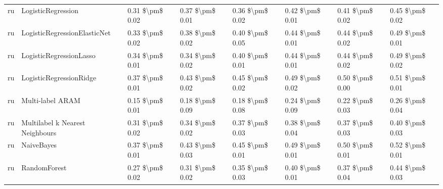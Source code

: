 \begin{tabular}{llllllll}
      ru &              LogisticRegression & 0.31 \$\textbackslash pm\$ 0.02 &           0.37 \$\textbackslash pm\$ 0.01 &       0.36 \$\textbackslash pm\$ 0.02 &        0.42 \$\textbackslash pm\$ 0.01 &                         0.41 \$\textbackslash pm\$ 0.02 &     0.45 \$\textbackslash pm\$ 0.02 \\
      ru &    LogisticRegressionElasticNet & 0.33 \$\textbackslash pm\$ 0.02 &           0.38 \$\textbackslash pm\$ 0.02 &       0.40 \$\textbackslash pm\$ 0.05 &        0.44 \$\textbackslash pm\$ 0.01 &                         0.44 \$\textbackslash pm\$ 0.02 &     0.49 \$\textbackslash pm\$ 0.01 \\
      ru &         LogisticRegressionLasso & 0.34 \$\textbackslash pm\$ 0.01 &           0.34 \$\textbackslash pm\$ 0.02 &       0.40 \$\textbackslash pm\$ 0.01 &        0.44 \$\textbackslash pm\$ 0.01 &                         0.44 \$\textbackslash pm\$ 0.02 &     0.49 \$\textbackslash pm\$ 0.02 \\
      ru &         LogisticRegressionRidge & 0.37 \$\textbackslash pm\$ 0.01 &           0.43 \$\textbackslash pm\$ 0.02 &       0.45 \$\textbackslash pm\$ 0.02 &        0.49 \$\textbackslash pm\$ 0.02 &                         0.50 \$\textbackslash pm\$ 0.00 &     0.51 \$\textbackslash pm\$ 0.01 \\
      ru &                Multi-label ARAM & 0.15 \$\textbackslash pm\$ 0.01 &           0.18 \$\textbackslash pm\$ 0.09 &       0.18 \$\textbackslash pm\$ 0.08 &        0.24 \$\textbackslash pm\$ 0.09 &                         0.22 \$\textbackslash pm\$ 0.03 &     0.26 \$\textbackslash pm\$ 0.04 \\
      ru & Multilabel k Nearest Neighbours & 0.31 \$\textbackslash pm\$ 0.02 &           0.34 \$\textbackslash pm\$ 0.02 &       0.37 \$\textbackslash pm\$ 0.03 &        0.38 \$\textbackslash pm\$ 0.04 &                         0.37 \$\textbackslash pm\$ 0.03 &     0.40 \$\textbackslash pm\$ 0.03 \\
      ru &                      NaiveBayes & 0.37 \$\textbackslash pm\$ 0.01 &           0.43 \$\textbackslash pm\$ 0.03 &       0.45 \$\textbackslash pm\$ 0.01 &        0.49 \$\textbackslash pm\$ 0.01 &                         0.50 \$\textbackslash pm\$ 0.01 &     0.52 \$\textbackslash pm\$ 0.01 \\
      ru &                    RandomForest & 0.27 \$\textbackslash pm\$ 0.02 &           0.31 \$\textbackslash pm\$ 0.02 &       0.35 \$\textbackslash pm\$ 0.03 &        0.40 \$\textbackslash pm\$ 0.01 &                         0.37 \$\textbackslash pm\$ 0.04 &     0.44 \$\textbackslash pm\$ 0.03 \\

\end{tabular}
